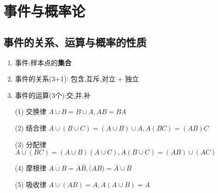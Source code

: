 \documentclass[12pt, a4paper, oneside, UTF8]{ctexbook}
\begin{document}
% 
\else
\fi

\chapter{事件与概率论}
\section{事件的关系、运算与概率的性质}
\begin{enumerate}
    \item 事件:样本点的\textbf{集合} 
    \item 事件的关系(3+1): 包含,互斥,对立 + 独立 
    \item 事件的运算(3个):交,并,补
\end{enumerate}
\begin{remark}[事件的运算律]
    \begin{enumerate}
    \item [(1)]\quad 交换律 \qquad $A\cup B = B\cup A, AB=BA$
    \item [(2)]\quad 结合律 \qquad $A\cup(B\cup C)=(A\cup B)\cup A, A(BC)=(AB)C$
    \item [(3)]\quad 分配律 \qquad $A\cup(BC)=(A\cup B)(A\cup C), A(B\cup C)=(AB)\cup(AC)$
    \item [(4)]\quad 摩根律 \qquad $\overline{A\cup B}=\bar{A}\bar{B},\overline(AB)=\bar{A}\cup\bar{B}$
    \item [(5)]\quad 吸收律 \qquad $A\cup(AB)=A,A(A\cup B)=A$
    \end{enumerate}
\end{remark}
\end{document}
